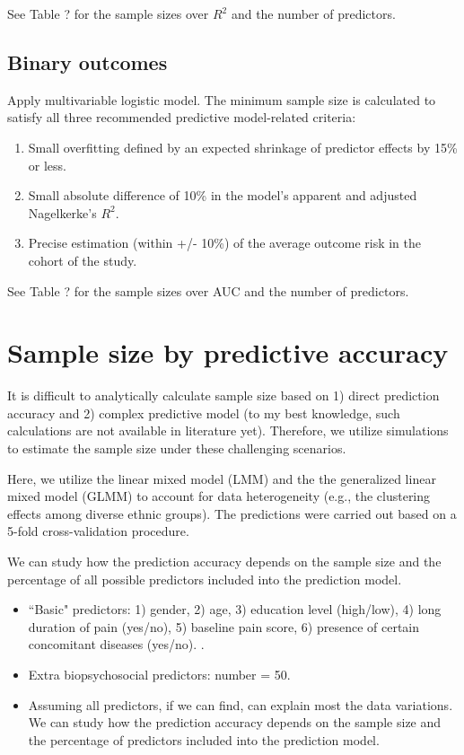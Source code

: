 \documentclass[12pt]{article}
\begin{document}
See Table ? for the sample sizes over $R^2$ and the number of predictors.

\subsection{Binary outcomes}

Apply multivariable logistic model. The minimum sample size is calculated to satisfy all three recommended predictive model-related criteria:
\begin{enumerate}
\item Small overfitting defined by an expected shrinkage of predictor effects by 15\% or less.
\item Small absolute difference of 10\% in the model's apparent and adjusted Nagelkerke's $R^2$.
\item Precise estimation (within +/- 10\%) of the average outcome risk in the cohort of the study. 
\end{enumerate}

See Table ? for the sample sizes over AUC and the number of predictors.


\section{Sample size by predictive accuracy}

It is difficult to analytically calculate sample size based on 1) direct prediction accuracy and 2) complex predictive model (to my best knowledge, such calculations are not available in literature yet). Therefore, we utilize simulations to estimate the sample size under these challenging scenarios. 

Here, we utilize the linear mixed model (LMM) and the the generalized linear mixed model (GLMM) to account for data heterogeneity (e.g., the clustering effects among diverse ethnic groups).  
The predictions were carried out based on a 5-fold cross-validation procedure. 

We can study how the prediction accuracy depends on the sample size and the percentage of all possible predictors included into the prediction model. 


\begin{itemize}
\item ``Basic" predictors: 1) gender, 2) age, 3) education level (high/low), 4) long duration of pain (yes/no), 5) baseline pain score, 6) presence of certain concomitant diseases (yes/no). \cite{cherkin2016effect, morone2016mind}. 

\item Extra biopsychosocial predictors: number = 50. 

\item Assuming all predictors, if we can find, can explain most the data variations. We can study how the prediction accuracy depends on the sample size and the percentage of predictors included into the prediction model. 
\end{itemize}
\end{document}
